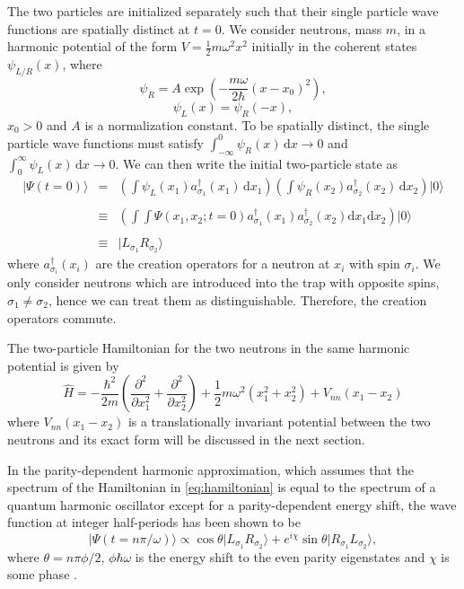 The two particles are initialized separately such that their single
particle wave functions are spatially distinct at $t = 0$. We consider
neutrons, mass $m$, in a harmonic potential of the form $V =
\frac{1}{2}m \omega^2x^2$ initially in the coherent states
$\psi_{L/R}(x)$, where
\begin{equation}
\psi_R = A\exp\left( -\frac{m\omega}{2\hbar}(x - x_0)^2 \right) ,
\end{equation}
\begin{equation}
\psi_L(x) = \psi_R(-x),
\end{equation}
$x_0 > 0$ and $A$ is a normalization constant. To be spatially distinct, the
single particle wave functions must satisfy $\int_{-\infty}^0 \! \psi_R(x) \,
\mathrm{d} x \to 0$ and $\int^{\infty}_0 \! \psi_L(x) \, \mathrm{d} x
\to 0$. We can then write the initial two-particle state as
\begin{equation}
\begin{array} {lcl}
|\Psi(t=0)\rangle & = & \left( \int \!
\psi_L(x_1)a^\dagger_{\sigma_1}(x_1) \, \mathrm{d} x_1 \right) \left(
\int \! \psi_R(x_2)a^\dagger_{\sigma_2}(x_2) \, \mathrm{d} x_2 \right)
|0\rangle \\\\ & \equiv & \left( \int\int\Psi(x_1, x_2;
t=0)a^\dagger_{\sigma_1}(x_1)a^\dagger_{\sigma_2}(x_2) \mathrm{d} x_1
\mathrm{d} x_2 \right) |0\rangle \\\\ & \equiv &
|L_{\sigma_1}R_{\sigma_2}\rangle
\end{array}
\end{equation}
where $a^\dagger_{\sigma_i}(x_i)$ are the creation operators for a
neutron at $x_i$ with spin $\sigma_i$. We only consider neutrons which
are introduced into the trap with opposite spins, $\sigma_1 \neq
\sigma_2$, hence we can treat them as distinguishable. Therefore, the
creation operators commute.

The two-particle Hamiltonian for the two neutrons in the same harmonic
potential is given by
\begin{equation}\label{eq:hamiltonian}
\hat{H} = -\frac{\hbar^2}{2m}\left( \frac{\partial^2}{\partial x_1^2}
+ \frac{\partial^2}{\partial x_2^2} \right) +
\frac{1}{2}m\omega^2(x_1^2 + x_2^2) + V_{nn}(x_1-x_2)
\end{equation}
where $V_{nn}(x_1-x_2)$ is a translationally invariant potential between
the two neutrons and its exact form will be discussed in the next
section.

In the parity-dependent harmonic approximation, which assumes that the
spectrum of the Hamiltonian in \eqref{eq:hamiltonian} is equal to the
spectrum of a quantum harmonic oscillator except for a
parity-dependent energy shift, the wave function at integer
half-periods has been shown to be
\begin{equation}
|\Psi(t=n\pi/\omega)\rangle \propto
\cos\theta|L_{\sigma_1}R_{\sigma_2}\rangle +
e^{i\chi}\sin\theta|R_{\sigma_1}L_{\sigma_2}\rangle,
\end{equation}
where $\theta = n\pi\phi/2$, $\phi\hbar\omega$ is the energy shift
to the even parity eigenstates and $\chi$ is some phase \cite{edmund}.


